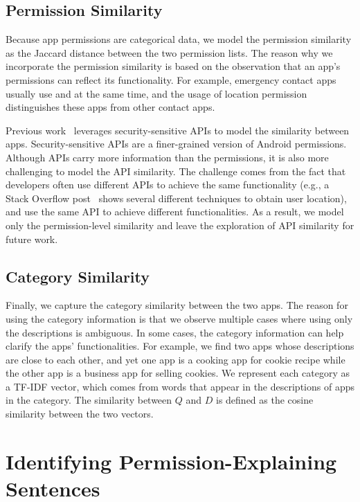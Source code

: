 \subsection{Permission Similarity}

Because app permissions are categorical data, we model the permission similarity as the Jaccard distance between the two permission lists. 
The reason why we incorporate the permission similarity is based on the observation that an app's permissions can reflect its functionality. 
For example, emergency contact apps usually use  and  at the same time, and the usage of location permission distinguishes these apps from other contact apps. 

Previous work~\cite{conf/icse/GorlaTGZ14} leverages security-sensitive APIs to model the similarity between apps. Security-sensitive APIs are a finer-grained version of Android permissions. 
Although APIs carry more information than the permissions, it is also more challenging to model the API similarity. 
The challenge comes from the fact that developers often use different APIs to achieve the same functionality (e.g., a Stack Overflow post~\cite{getcurrentlocation} shows several different techniques to obtain user location), and use the same API to achieve different functionalities.
As a result, we model only the permission-level similarity and leave the exploration of API similarity for future work. 

\subsection{Category Similarity}

Finally, we capture the category similarity between the two apps. 
The reason for using the category information is that we observe multiple cases where using only the descriptions is ambiguous.
In some cases, the category information can help clarify the apps' functionalities. 
For example, we find two apps whose descriptions are close to each other, and yet one app is a cooking app for cookie recipe while the other app is a business app for selling cookies. 
We represent each category as a TF-IDF vector, which comes from words that appear in the descriptions of apps in the category. 
The similarity between $Q$ and $D$ is defined as the cosine similarity between the two vectors.

\section{Identifying Permission-Explaining Sentences}
\label{sec:identify}

